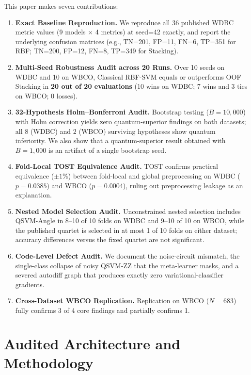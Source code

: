 \documentclass[journal,twocolumn]{IEEEtran}
\begin{document}
This paper makes seven contributions:
\begin{enumerate}
    \item \textbf{Exact Baseline Reproduction.} We reproduce all 36 published WDBC metric values (9 models $\times$ 4 metrics) at seed=42 exactly, and report the underlying confusion matrices (e.g., TN=201, FP=11, FN=6, TP=351 for RBF; TN=200, FP=12, FN=8, TP=349 for Stacking).
    \item \textbf{Multi-Seed Robustness Audit across 20 Runs.} Over 10 seeds on WDBC and 10 on WBCO, Classical RBF-SVM equals or outperforms OOF Stacking in \textbf{20 out of 20 evaluations} (10 wins on WDBC; 7 wins and 3 ties on WBCO; 0 losses).
    \item \textbf{32-Hypothesis Holm--Bonferroni Audit.} Bootstrap testing ($B=10{,}000$) with Holm correction yields zero quantum-superior findings on both datasets; all 8 (WDBC) and 2 (WBCO) surviving hypotheses show quantum inferiority. We also show that a quantum-superior result obtained with $B=1{,}000$ is an artifact of a single bootstrap seed.
    \item \textbf{Fold-Local TOST Equivalence Audit.} TOST confirms practical equivalence ($\pm 1\%$) between fold-local and global preprocessing on WDBC ($p = 0.0385$) and WBCO ($p = 0.0004$), ruling out preprocessing leakage as an explanation.
    \item \textbf{Nested Model Selection Audit.} Unconstrained nested selection includes QSVM-Angle in 8--10 of 10 folds on WDBC and 9--10 of 10 on WBCO, while the published quartet is selected in at most 1 of 10 folds on either dataset; accuracy differences versus the fixed quartet are not significant.
    \item \textbf{Code-Level Defect Audit.} We document the noise-circuit mismatch, the single-class collapse of noisy QSVM-ZZ that the meta-learner masks, and a severed autodiff graph that produces exactly zero variational-classifier gradients.
    \item \textbf{Cross-Dataset WBCO Replication.} Replication on WBCO ($N=683$) fully confirms 3 of 4 core findings and partially confirms 1.
\end{enumerate}

\section{Audited Architecture and Methodology}
\label{sec:methodology}
\end{document}
